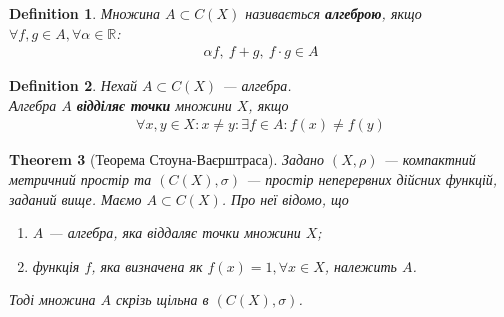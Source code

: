 \documentclass[a4paper, 10pt]{article}
\theoremstyle{theoremdd}
\newtheorem{theorem}{Theorem}[subsection]
\theoremstyle{theoremdd}
\newtheorem{definition}[theorem]{Definition}
\theoremstyle{theoremdd}
\theoremstyle{theoremdd}
\theoremstyle{theoremdd}
\theoremstyle{theoremdd}
\theoremstyle{theoremdd}
\theoremstyle{theoremdd}
\begin{document}
\begin{definition}
Множина $A \subset C(X)$ називається \textbf{алгеброю}, якщо $\forall f,g \in A, \forall \alpha \in \mathbb{R}$:
\begin{align*}
\alpha f,\ f+g,\ f \cdot g \in A
\end{align*}
\end{definition}

\begin{definition}
Нехай $A \subset C(X)$ --- алгебра.\\
Алгебра $A$ \textbf{відділяє точки} множини $X$, якщо
\begin{align*}
\forall x,y \in X: x \neq y: \exists f \in A: f(x) \neq f(y)
\end{align*}
\end{definition}

\begin{theorem}[Теорема Стоуна-Ваєрштраса]
Задано $(X,\rho)$ --- компактний метричний простір та $(C(X),\sigma)$ --- простір неперервних дійсних функцій, заданий вище. Маємо $A \subset C(X)$. Про неї відомо, що
\begin{enumerate}[nosep,wide=0pt,label={\arabic*)}]
\item $A$ --- алгебра, яка віддаляє точки множини $X$;
\item функція $f$, яка визначена як $f(x) = 1, \forall x \in X$, належить $A$.
\end{enumerate}
Тоді множина $A$ скрізь щільна в $(C(X),\sigma)$.
\end{theorem}
\end{document}
